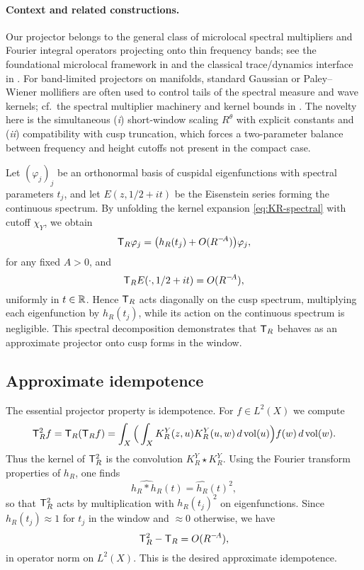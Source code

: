 \paragraph{Context and related constructions.}
Our projector belongs to the general class of microlocal spectral multipliers and Fourier integral operators projecting onto thin frequency bands; see the foundational microlocal framework in \cite{hormander1994III} and the classical trace/dynamics interface in \cite{duistermaatguillemin1975}. For band-limited projectors on manifolds, standard Gaussian or Paley--Wiener mollifiers are often used to control tails of the spectral measure and wave kernels; cf.\ the spectral multiplier machinery and kernel bounds in \cite[Ch.~5--6]{sogge1993}. The novelty here is the simultaneous (\emph{i}) short-window scaling $R^\theta$ with explicit constants and (\emph{ii}) compatibility with cusp truncation, which forces a two-parameter balance between frequency and height cutoffs not present in the compact case.

Let $(\varphi_j)_j$ be an orthonormal basis of cuspidal eigenfunctions with spectral parameters $t_j$, and let $E(z,1/2+it)$ be the Eisenstein series forming the continuous spectrum. By unfolding the kernel expansion \eqref{eq:KR-spectral} with cutoff $\chi_Y$, we obtain
\[
\mathsf{T}_R \varphi_j = \big(h_R(t_j) + O(R^{-\!A})\big)\varphi_j,
\]
for any fixed $A>0$, and
\[
\mathsf{T}_R E(\cdot,1/2+it) = O(R^{-\!A}),
\]
uniformly in $t\in\mathbb{R}$. Hence $\mathsf{T}_R$ acts diagonally on the cusp spectrum, multiplying each eigenfunction by $h_R(t_j)$, while its action on the continuous spectrum is negligible. This spectral decomposition demonstrates that $\mathsf{T}_R$ behaves as an approximate projector onto cusp forms in the window.

\subsection{Approximate idempotence}\label{subsec:proj-idempotence}

The essential projector property is idempotence. For $f\in L^2(X)$ we compute
\[
\mathsf{T}_R^2 f = \mathsf{T}_R(\mathsf{T}_R f) = \int_X \Big(\int_X K_R^Y(z,u)K_R^Y(u,w)\,d\operatorname{vol}(u)\Big) f(w)\,d\operatorname{vol}(w).
\]
Thus the kernel of $\mathsf{T}_R^2$ is the convolution $K_R^Y \star K_R^Y$. Using the Fourier transform properties of $h_R$, one finds
\[
\widehat{h_R * h_R}(t) = \widehat{h_R}(t)^2,
\]
so that $\mathsf{T}_R^2$ acts by multiplication with $h_R(t_j)^2$ on eigenfunctions. Since $h_R(t_j)\approx 1$ for $t_j$ in the window and $\approx 0$ otherwise, we have
\[
\mathsf{T}_R^2 - \mathsf{T}_R = O(R^{-\!A}),
\]
in operator norm on $L^2(X)$. This is the desired approximate idempotence.

